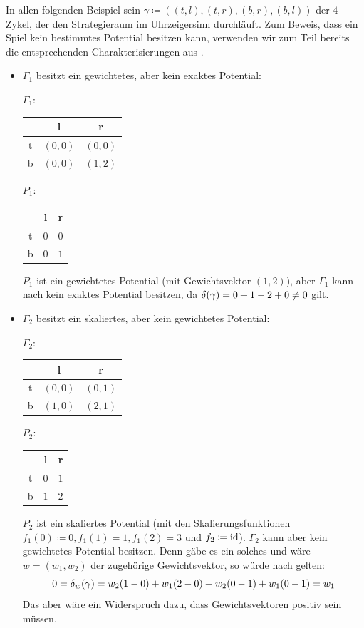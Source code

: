\begin{bsp}
	In allen folgenden Beispiel sein $\gamma \coloneqq ((t,l), (t,r), (b,r), (b,l))$ der $4$-Zykel, der den Strategieraum im Uhrzeigersinn durchläuft. Zum Beweis, dass ein Spiel kein bestimmtes Potential besitzen kann, verwenden wir zum Teil bereits die entsprechenden Charakterisierungen aus .
	\begin{itemize}
		\item $\Gamma_1$ besitzt ein gewichtetes, aber kein exaktes Potential:
			\begin{center}
				$\Gamma_1:$ \quad
				\begin{tabular}{c||c|c}
					& l 		& r 		\\\hline\hline
					t	& $(0,0)$	& $(0,0)$	\\\hline
					b	& $(0,0)$	& $(1,2)$ 
				\end{tabular}\hspace{5em}
				$P_1:$ \quad
				\begin{tabular}{c||c|c}
					& l 		& r 		\\\hline\hline
					t	& $0$	& $0$	\\\hline
					b	& $0$	& $1$ 
				\end{tabular}
			\end{center}
			$P_1$ ist ein gewichtetes Potential (mit Gewichtsvektor $(1,2)$), aber $\Gamma_1$ kann nach  kein exaktes Potential besitzen, da $\delta(\gamma) = 0 + 1 - 2 + 0 \neq 0$ gilt.
		
		\item $\Gamma_2$ besitzt ein skaliertes, aber kein gewichtetes Potential:
			\begin{center}
				$\Gamma_2:$ \quad
				\begin{tabular}{c||c|c}
					& l 		& r 		\\\hline\hline
					t	& $(0,0)$	& $(0,1)$	\\\hline
					b	& $(1,0)$	& $(2,1)$ 
				\end{tabular}\hspace{5em}
				$P_2:$ \quad
				\begin{tabular}{c||c|c}
					& l 		& r 		\\\hline\hline
					t	& $0$	& $1$	\\\hline
					b	& $1$	& $2$ 
				\end{tabular}
			\end{center}
			$P_2$ ist ein skaliertes Potential (mit den Skalierungsfunktionen $f_1(0) \coloneqq 0, f_1(1) = 1, f_1(2) = 3$ und $f_2 \coloneqq \mathrm{id}$). $\Gamma_2$ kann aber kein gewichtetes Potential besitzen. Denn gäbe es ein solches und wäre $w = (w_1, w_2)$ der zugehörige Gewichtsvektor, so würde nach  gelten:
				\[0 = \delta_w(\gamma) = w_2(1-0) + w_1(2-0) + w_2(0-1) + w_1(0-1) = w_1 \]
			Das aber wäre ein Widerspruch dazu, dass Gewichtsvektoren positiv sein müssen.
			

\end{itemize}
\end{bsp}
